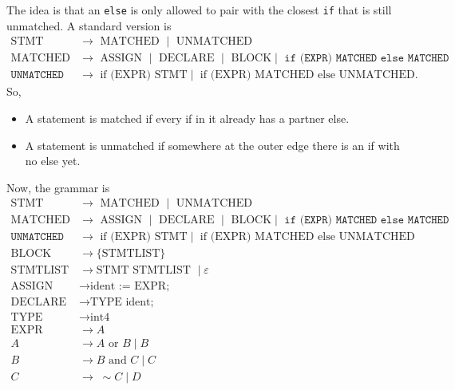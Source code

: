 \documentclass{report}
\begin{document}
\begin{itemize}
\begin{enumerate}
            \end{enumerate}
            The idea is that an \texttt{else} is only allowed to pair with the closest \texttt{if} that is still unmatched.
            \bigbreak \noindent 
            A standard version is
            \begin{align*}
                \text{STMT}      &\to \text{ MATCHED } \mid  \text{ UNMATCHED} \\
                \text{MATCHED}   &\to \text{ ASSIGN } \mid \text{ DECLARE } \mid \text{ BLOCK} \mid \texttt{ if (EXPR) MATCHED else MATCHED} \\
                \texttt{UNMATCHED} &\to \text{ if (EXPR) STMT} \mid \text{ if (EXPR) MATCHED else UNMATCHED}
            .\end{align*}
            So, 
            \begin{itemize}
                \item A statement is matched if every if in it already has a partner else.
                \item A statement is unmatched if somewhere at the outer edge there is an if with no else yet.
            \end{itemize}
            Now, the grammar is
            \begin{align*}
                \text{STMT}      &\to \text{ MATCHED } \mid  \text{ UNMATCHED} \\
                \text{MATCHED}   &\to \text{ ASSIGN } \mid \text{ DECLARE } \mid \text{ BLOCK} \mid \texttt{ if (EXPR) MATCHED else MATCHED} \\
                \texttt{UNMATCHED} &\to \text{ if (EXPR) STMT} \mid \text{ if (EXPR) MATCHED else UNMATCHED} \\
                \text{BLOCK} &\to \{\text{STMTLIST}\} \\
                \text{STMTLIST} &\to \text{STMT STMTLIST } \mid \varepsilon \\
                \text{ASSIGN} &\to  \text{ident := EXPR; }\\
                \text{DECLARE} &\to \text{TYPE ident; } \\
                \text{TYPE} &\to \text{int4} \\
                \text{EXPR} &\to  A \\
                A &\to A \text{ or } B \mid B\\
                B &\to B \text{ and } C \mid C\\
                C &\to\; \sim C \mid D \\

\end{align*}
\end{itemize}
\end{document}
